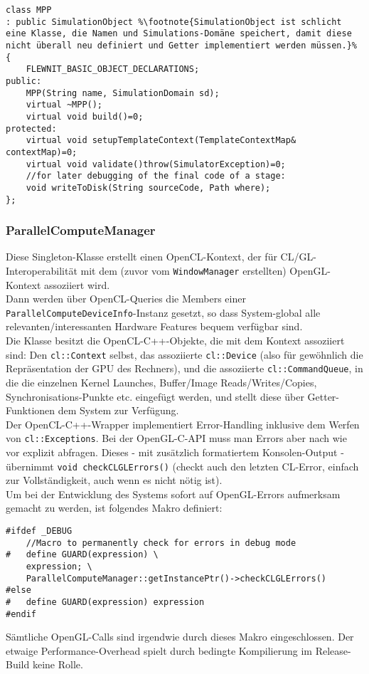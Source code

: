	\begin{lstlisting}[escapechar=\%]
class MPP
: public SimulationObject %\footnote{SimulationObject ist schlicht eine Klasse, die Namen und Simulations-Domäne speichert, damit diese nicht überall neu definiert und Getter implementiert werden müssen.}%
{
	FLEWNIT_BASIC_OBJECT_DECLARATIONS;
public:
	MPP(String name, SimulationDomain sd);
	virtual ~MPP();
	virtual void build()=0;
protected:
	virtual void setupTemplateContext(TemplateContextMap& contextMap)=0;
	virtual void validate()throw(SimulatorException)=0;
	//for later debugging of the final code of a stage:
	void writeToDisk(String sourceCode, Path where);
};
\end{lstlisting}




	\subsubsection{ParallelComputeManager}
	Diese Singleton-Klasse erstellt einen OpenCL-Kontext, der für CL/GL-Interoperabilität 
	mit dem (zuvor vom \lstinline|WindowManager| erstellten) OpenGL-Kontext assoziiert wird.\\
	Dann werden über OpenCL-Queries die Members einer \lstinline|ParallelComputeDeviceInfo|-Instanz
	gesetzt, so dass System-global alle relevanten/interessanten Hardware Features bequem verfügbar sind.\\
	
	Die Klasse besitzt die OpenCL-C++-Objekte, die mit dem Kontext assoziiert sind:
	Den \lstinline|cl::Context| selbst, das assoziierte \lstinline|cl::Device| (also für gewöhnlich die
	Repräsentation der GPU des Rechners), und die assoziierte \lstinline|cl::CommandQueue|, in die die einzelnen
	Kernel Launches, Buffer/Image Reads/Writes/Copies, Synchronisations-Punkte etc. eingefügt werden,
	und stellt diese über Getter-Funktionen dem System zur Verfügung.\\
	
	Der OpenCL-C++-Wrapper implementiert Error-Handling inklusive dem Werfen von \lstinline|cl::Exceptions|.
	Bei der OpenGL-C-API muss man Errors aber nach wie vor explizit abfragen. Dieses - mit zusätzlich formatiertem
	Konsolen-Output - übernimmt \lstinline|void checkCLGLErrors()| (checkt auch den letzten CL-Error, einfach zur 
	Vollständigkeit, auch wenn es nicht nötig ist).\\
	Um bei der Entwicklung des Systems	sofort auf OpenGL-Errors aufmerksam gemacht zu werden, ist folgendes Makro
	definiert:
\begin{lstlisting}	
#ifdef _DEBUG
	//Macro to permanently check for errors in debug mode
#	define GUARD(expression) \
	expression; \
	ParallelComputeManager::getInstancePtr()->checkCLGLErrors()
#else
#	define GUARD(expression) expression
#endif
\end{lstlisting}
	Sämtliche OpenGL-Calls sind irgendwie durch dieses Makro eingeschlossen. Der etwaige Performance-Overhead spielt
	durch bedingte Kompilierung im Release-Build keine Rolle.\\
	
